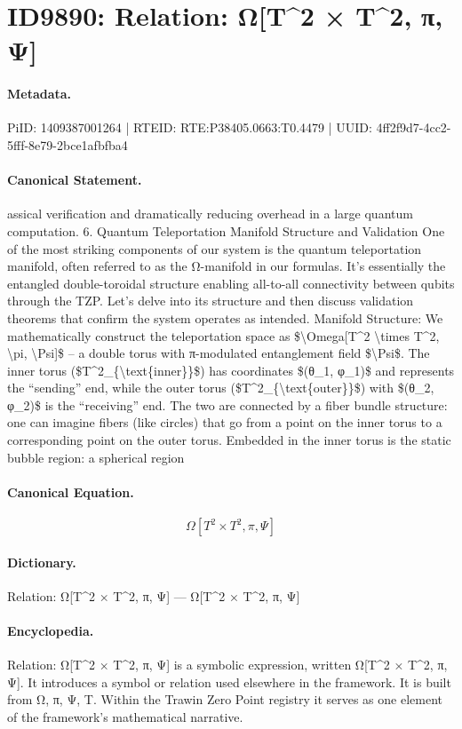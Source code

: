 \section*{ID9890: Relation: Ω[T\textasciicircum{}2 × T\textasciicircum{}2, π, Ψ]}
\paragraph{Metadata.}
PiID: 1409387001264 | RTEID: RTE:P38405.0663:T0.4479 | UUID: 4ff2f9d7-4cc2-5fff-8e79-2bce1afbfba4

\paragraph{Canonical Statement.}
assical verification and dramatically reducing overhead in a large quantum computation. 6. Quantum Teleportation Manifold Structure and Validation One of the most striking components of our system is the quantum teleportation manifold, often referred to as the Ω-manifold in our formulas. It’s essentially the entangled double-toroidal structure enabling all-to-all connectivity between qubits through the TZP. Let’s delve into its structure and then discuss validation theorems that confirm the system operates as intended. Manifold Structure: We mathematically construct the teleportation space as \$\textbackslash{}Omega[T\textasciicircum{}2 \textbackslash{}times T\textasciicircum{}2, \textbackslash{}pi, \textbackslash{}Psi]\$ – a double torus with π-modulated entanglement field \$\textbackslash{}Psi\$. The inner torus (\$T\textasciicircum{}2\_\{\textbackslash{}text\{inner\}\}\$) has coordinates \$(θ\_1, φ\_1)\$ and represents the “sending” end, while the outer torus (\$T\textasciicircum{}2\_\{\textbackslash{}text\{outer\}\}\$) with \$(θ\_2, φ\_2)\$ is the “receiving” end. The two are connected by a fiber bundle structure: one can imagine fibers (like circles) that go from a point on the inner torus to a corresponding point on the outer torus. Embedded in the inner torus is the static bubble region: a spherical region

\paragraph{Canonical Equation.}
\[
\Omega[T^2 \times T^2, \pi, \Psi]
\]

\paragraph{Dictionary.}
Relation: Ω[T\textasciicircum{}2 × T\textasciicircum{}2, π, Ψ] — Ω[T\textasciicircum{}2 × T\textasciicircum{}2, π, Ψ]

\paragraph{Encyclopedia.}
Relation: Ω[T\textasciicircum{}2 × T\textasciicircum{}2, π, Ψ] is a symbolic expression, written Ω[T\textasciicircum{}2 × T\textasciicircum{}2, π, Ψ]. It introduces a symbol or relation used elsewhere in the framework. It is built from Ω, π, Ψ, T. Within the Trawin Zero Point registry it serves as one element of the framework's mathematical narrative.
